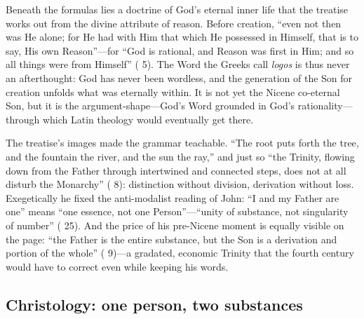 Beneath the formulas lies a doctrine of God's eternal inner life that the
treatise works out from the divine attribute of reason. Before creation,
``even not then was He alone; for He had with Him that which He possessed in
Himself, that is to say, His own Reason''---for ``God is rational, and Reason
was first in Him; and so all things were from Himself'' ( 5). The Word the Greeks call \textit{logos} is thus never an
afterthought: God has never been wordless, and the generation of the Son for
creation unfolds what was eternally within. It is not yet the Nicene
co-eternal Son, but it is the argument-shape---God's Word grounded in God's
rationality---through which Latin theology would eventually get there.

The treatise's images made the grammar teachable. ``The root puts forth the
tree, and the fountain the river, and the sun the ray,'' and just so ``the
Trinity, flowing down from the Father through intertwined and connected
steps, does not at all disturb the Monarchy'' ( 8):
distinction without division, derivation without loss. Exegetically he fixed
the anti-modalist reading of John: ``I and my Father are one'' means ``one
essence, not one Person''---``unity of substance, not singularity of number''
( 25). And the price of his pre-Nicene moment is
equally visible on the page: ``the Father is the entire substance, but the Son
is a derivation and portion of the whole'' ( 9)---a
gradated, economic Trinity that the fourth century would have to correct even
while keeping his words.

\subsection{Christology: one person, two substances}

